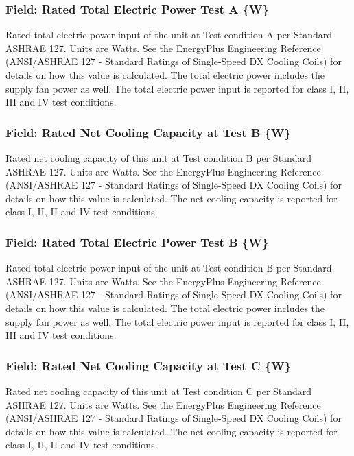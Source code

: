 \subsubsection{Field: Rated Total Electric Power Test A \{W\}}\label{field-rated-total-electric-power-test-a-w}

Rated total electric power input of the unit at Test condition A per Standard ASHRAE 127. Units are Watts. See the EnergyPlus Engineering Reference (ANSI/ASHRAE 127 - Standard Ratings of Single-Speed DX Cooling Coils) for details on how this value is calculated. The total electric power includes the supply fan power as well. The total electric power input is reported for class I, II, III and IV test conditions.

\subsubsection{Field: Rated Net Cooling Capacity at Test B \{W\}}\label{field-rated-net-cooling-capacity-at-test-b-w}

Rated net cooling capacity of this unit at Test condition B per Standard ASHRAE 127. Units are Watts. See the EnergyPlus Engineering Reference (ANSI/ASHRAE 127 - Standard Ratings of Single-Speed DX Cooling Coils) for details on how this value is calculated. The net cooling capacity is reported for class I, II, II and IV test conditions.

\subsubsection{Field: Rated Total Electric Power Test B \{W\}}\label{field-rated-total-electric-power-test-b-w}

Rated total electric power input of the unit at Test condition B per Standard ASHRAE 127. Units are Watts. See the EnergyPlus Engineering Reference (ANSI/ASHRAE 127 - Standard Ratings of Single-Speed DX Cooling Coils) for details on how this value is calculated. The total electric power includes the supply fan power as well. The total electric power input is reported for class I, II, III and IV test conditions.

\subsubsection{Field: Rated Net Cooling Capacity at Test C \{W\}}\label{field-rated-net-cooling-capacity-at-test-c-w}

Rated net cooling capacity of this unit at Test condition C per Standard ASHRAE 127. Units are Watts. See the EnergyPlus Engineering Reference (ANSI/ASHRAE 127 - Standard Ratings of Single-Speed DX Cooling Coils) for details on how this value is calculated. The net cooling capacity is reported for class I, II, II and IV test conditions.

